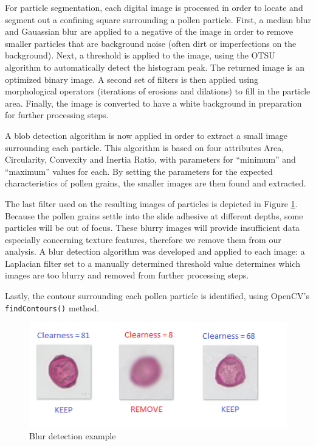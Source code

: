 \documentclass[runningheads,a4paper]{llncs}
\begin{document}
For particle segmentation, each digital image is processed in order to locate and segment out a confining square surrounding a pollen particle. First, a median blur and Gauassian blur are applied to a negative of the image in order to remove smaller particles that are background noise (often dirt or imperfections on the background). 
Next, a threshold is applied to the image, using the OTSU algorithm to automatically detect the histogram peak. The returned image is an optimized binary image. A second set of filters is then applied using morphological operators (iterations of erosions and dilations) to fill in the particle area. Finally, the image is converted to have a white background in preparation for further processing steps.
  
  
  
  
  
  


A blob detection algorithm is now applied in order to extract a small image surrounding each particle. This algorithm is based on four attributes {\textendash} Area, Circularity, Convexity and Inertia Ratio, with parameters for {\textquotedblleft}minimum{\textquotedblright} and {\textquotedblleft}maximum{\textquotedblright} values for each. By setting the parameters for the expected characteristics of pollen grains, the smaller images are then found and extracted.


The last filter used on the resulting images of particles is depicted in Figure \ref{fig:clearness}. Because the pollen grains settle into the slide adhesive at different depths, some particles will be out of focus. These blurry images will provide insufficient data especially concerning texture features, therefore we remove them from our analysis. A blur detection algorithm was developed and applied to each image: a Laplacian filter set to a manually determined threshold value determines which images are too blurry and removed from further processing steps. 

Lastly, the contour surrounding each pollen particle is identified, using OpenCV's \verb|findContours()| method. 

  
  
  
  

\begin{figure}[h!]
\begin{center}
\includegraphics[width=0.7\columnwidth]{figures/clear example/clear example.png}
\caption{\label{fig:clearness}
Blur detection example
}
\end{center}
\end{figure}
\end{document}
